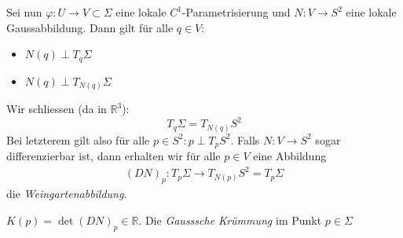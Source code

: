 \documentclass[../main.tex]{subfiles}
\begin{document}
Sei nun $\varphi : U \to V \subset \Sigma$ eine lokale $C^{1}$-Parametrisierung und $N:V \to S^{2}$ eine lokale Gaussabbildung. Dann gilt für alle $q \in V$:


\begin{itemize}
    \item $N(q) \perp T_{q}\Sigma$
    \item $N(q) \perp T_{N(q)}\Sigma$
\end{itemize}
Wir schliessen (da in $\mathbb{R}^3$): $$T_{q}\Sigma = T_{N(q)}S^{2}$$
Bei letzterem gilt also für alle $ p \in S^{2}: p\perp T_{p}S^2$.
Falls $N:V \to S^{2}$ sogar differenzierbar ist, dann erhalten wir für alle $ p \in V$ eine Abbildung
\begin{align*}
    (DN)_{p}: T_{p}\Sigma \to T_{N(p)}S^{2} = T_{p}\Sigma    
\end{align*}
die \emph{Weingartenabbildung}.

\begin{definition}$K(p) = \det{(DN)_{p}}\in \mathbb{R}$. Die \emph{Gausssche Krümmung} im Punkt $p \in \Sigma$
\end{definition}
\end{document}
